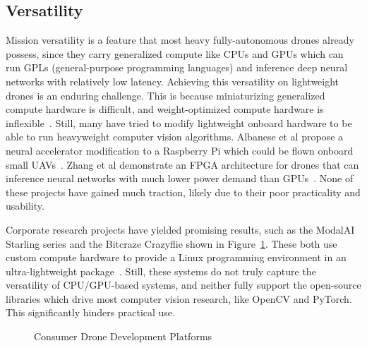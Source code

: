 \subsection{Versatility}
Mission versatility is a feature that most heavy fully-autonomous drones already possess, since they carry generalized compute like CPUs and GPUs which can run GPLs (general-purpose programming languages) and inference deep neural networks with relatively low latency. Achieving this versatility on lightweight drones is an enduring challenge. This is because miniaturizing generalized compute hardware is difficult, and weight-optimized compute hardware is inflexible~\cite{Hu2022}. Still, many have tried to modify lightweight onboard hardware to be able to run heavyweight computer vision algorithms. Albanese et al propose a neural accelerator modification to a Raspberry Pi which could be flown onboard small UAVs~\cite{Albanese2022}. Zhang et al demonstrate an FPGA architecture for drones that can inference neural networks with much lower power demand than GPUs~\cite{Zhang2022}. None of these projects have gained much traction, likely due to their poor practicality and usability.

Corporate research projects have yielded promising results, such as the ModalAI Starling series and the Bitcraze Crazyflie shown in Figure~\ref{fig:drone-dev-platforms}. These both use custom compute hardware to provide a Linux programming environment in an ultra-lightweight package~\cite{Bitcraze, ModalAI}. Still, these systems do not truly capture the versatility of CPU/GPU-based systems, and neither fully support the open-source libraries which drive most computer vision research, like OpenCV and PyTorch. This significantly hinders practical use.

\begin{figure}
    \centering
    \qquad
    \caption{Consumer Drone Development Platforms}
    \label{fig:drone-dev-platforms}
\end{figure}

